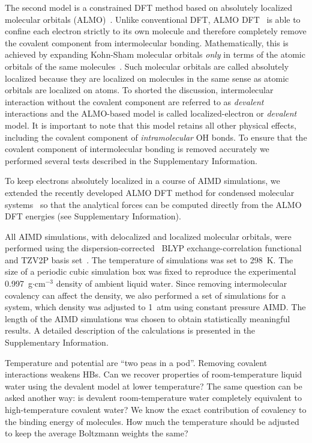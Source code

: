 \documentclass[prl,twocolumn,showpacs]{revtex4}
\begin{document}
The second model is a constrained DFT method based on absolutely localized molecular orbitals (ALMO)~\cite{khaliullin2006efficient}. Unlike conventional DFT, ALMO DFT~\cite{Khaliullin2013JCTC} is able to confine each electron strictly to its own molecule and therefore completely remove the covalent component from intermolecular bonding. Mathematically, this is achieved by expanding Kohn-Sham molecular orbitals \emph{only} in terms of the atomic orbitals of the same molecules~\cite{gian,khaliullin2006efficient, blw}. Such molecular orbitals are called absolutely localized because they are localized on molecules in the same sense as atomic orbitals are localized on atoms. To shorted the discussion, intermolecular interaction without the covalent component are referred to as \emph{devalent} interactions and the ALMO-based model is called localized-electron or \emph{devalent} model. It is important to note that this model retains all other physical effects, including the covalent component of \emph{intramolecular} OH bonds. %
To ensure that the covalent component of intermolecular bonding is removed accurately we performed several tests described in the Supplementary Information.

To keep electrons absolutely localized in a course of AIMD simulations, we extended the recently developed ALMO DFT method for  condensed molecular systems~\cite{Khaliullin2013JCTC} so that the analytical forces can be computed directly from the ALMO DFT energies (see Supplementary Information). 

All AIMD simulations, with delocalized and localized molecular orbitals, were performed using the dispersion-corrected~\cite{grimme2010consistent} BLYP exchange-correlation functional~\cite{becke1988density} and TZV2P basis set~\cite{vandevondele2007gaussian}. The temperature of simulations was set to 298~K. The size of a periodic cubic simulation box was fixed to reproduce the experimental 0.997~g$\cdot$cm$^{-3}$ density of ambient liquid water. Since removing intermolecular covalency can affect the density, we also performed a set of simulations for a system, which density was adjusted to 1~atm using constant pressure AIMD. The length of the AIMD simulations was chosen to obtain statistically meaningful results. A detailed description of the calculations is presented in the Supplementary Information.

\new Temperature and potential are ``two peas in a pod''. Removing covalent interactions weakens HBs. Can we recover properties of room-temperature liquid water using the devalent model at lower temperature? The same question can be asked another way: is devalent room-temperature water completely equivalent to high-temperature covalent water? We know the exact contribution of covalency to the binding energy of molecules. How much the temperature should be adjusted to keep the average Boltzmann weights the same?\old
\end{document}
